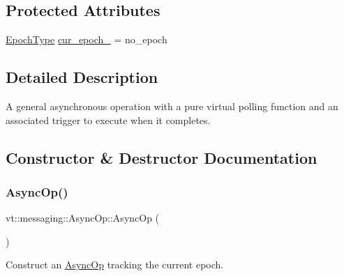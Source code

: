 \subsection*{Protected Attributes}
\begin{DoxyCompactItemize}
\item 
\hyperlink{namespacevt_a81d11b28122d43bf9834577e4a06440f}{Epoch\+Type} \hyperlink{structvt_1_1messaging_1_1_async_op_a19b64071b5b952c062139c9d1b1ce15b}{cur\+\_\+epoch\+\_\+} = no\+\_\+epoch
\end{DoxyCompactItemize}


\subsection{Detailed Description}
A general asynchronous operation with a pure virtual polling function and an associated trigger to execute when it completes. 

\subsection{Constructor \& Destructor Documentation}
\mbox{\label{structvt_1_1messaging_1_1_async_op_a4d2f22c0789b0fecbaced56c3129d1d4}} 
\subsubsection{\texorpdfstring{Async\+Op()}{AsyncOp()}\hspace{0.1cm}{\footnotesize\ttfamily [1/3]}}
{\footnotesize\ttfamily vt\+::messaging\+::\+Async\+Op\+::\+Async\+Op (\begin{DoxyParamCaption}{ }\end{DoxyParamCaption})}



Construct an {\ttfamily \hyperlink{structvt_1_1messaging_1_1_async_op}{Async\+Op}} tracking the current epoch. 

\mbox{\label{structvt_1_1messaging_1_1_async_op_ad00e71b03c2ed178f06630c9443f7a22}} 
